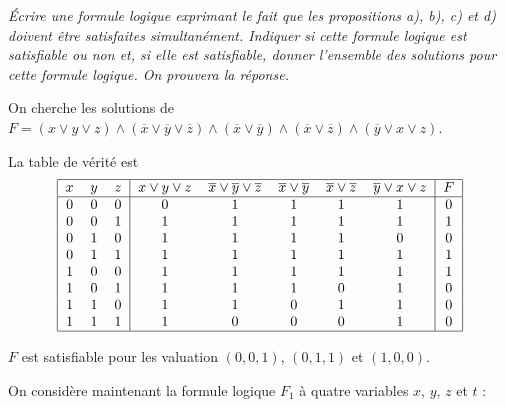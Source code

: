 \begin{Exercise}\it
Écrire une formule logique exprimant le fait que les propositions a), b), c) et d) doivent être satisfaites simultanément. Indiquer si cette formule logique est satisfiable ou non et, si elle est satisfiable, donner l’ensemble des solutions pour cette formule logique. On prouvera la réponse.
\end{Exercise}
\begin{Answer}

On cherche les solutions de $F=(x \lor y \lor z)\land(\overline x \lor \overline y \lor \overline z)\land(\overline x \lor \overline y) \land (\overline x \lor \overline z)\land(\overline y \lor x \lor z)$.

La table de vérité est
\[
\begin{tabular}{|ccc|ccccc|c|}
\hline
$x$&$y$&$z$&$x \lor y \lor z$&$\overline x \lor \overline y \lor \overline z$&$\overline x \lor \overline y$&$\overline x \lor \overline z$&$\overline y \lor x \lor z$&$F$\\
\hline
0&0&0&0&1&1&1&1&0\\
0&0&1&1&1&1&1&1&1\\
0&1&0&1&1&1&1&0&0\\
0&1&1&1&1&1&1&1&1\\
1&0&0&1&1&1&1&1&1\\
1&0&1&1&1&1&0&1&0\\
1&1&0&1&1&0&1&1&0\\
1&1&1&1&0&0&0&1&0\\
\hline
\end{tabular}\]

$F$ est satisfiable pour les valuation $(0,0,1)$, $(0,1,1)$ et $(1,0,0)$.
\end{Answer}
\medskip

On considère maintenant la formule logique $F_1$ à quatre variables $x$, $y$, $z$ et $t$ :

